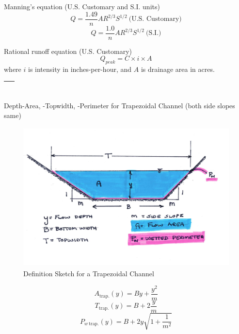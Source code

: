 \documentclass[12pt]{article}
\begin{document}
Manning's equation (U.S. Customary and S.I. units)
\begin{equation}
Q=\frac{1.49}{n} A R^{2/3} S^{1/2}~\text{(U.S. Customary)}
\end{equation}
\begin{equation}
Q=\frac{1.0}{n} A R^{2/3} S^{1/2}~\text{(S.I.)}
\end{equation}

Rational runoff equation (U.S. Customary)
\begin{equation}
Q_{peak}=C \times i \times A
\end{equation}
where $i$ is intensity in inches-per-hour, and $A$ is drainage area in acres.

\begin{tabular}{p{6in}}
~\\ \hline
\end{tabular}

Depth-Area, -Topwidth, -Perimeter for Trapezoidal Channel (both side slopes same)
\begin{figure}[h!] %
   \centering
   \includegraphics[height=3in]{TrapezoidChannelUS.jpg} 
   \caption{Definition Sketch for a Trapezoidal Channel}
   \label{fig:TrapezoidChannelUS.jpg}
\end{figure}

\begin{equation}
A_{\text{trap.}}(y) = B y + \frac{y^2}{m}
\end{equation}
\begin{equation}
T_{\text{trap.}}(y) = B + 2 \frac{y}{m}
\end{equation}
\begin{equation}
P_{w~\text{trap.}}(y) = B+2y\sqrt{1+\frac{1}{m^2}}
\end{equation}
\clearpage
\end{document}
